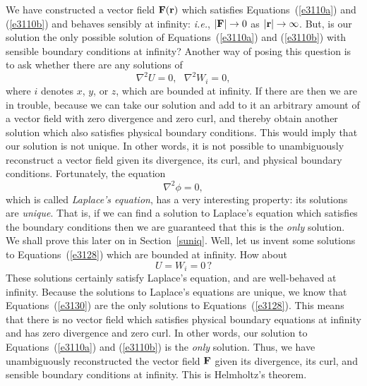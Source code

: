 We have  constructed a vector field ${\bf F}({\bf r})$ which satisfies Equations~(\ref{e3110a}) and (\ref{e3110b})
and  behaves sensibly at infinity: {\em i.e.}, $|{\bf F}|\rightarrow 0$ as
$|{\bf r}|\rightarrow \infty$. But, is our solution the only possible solution
of Equations~(\ref{e3110a}) and (\ref{e3110b}) with sensible boundary conditions at infinity? Another way of posing
this question is to ask whether there are any solutions of
\begin{equation}
\nabla^2 U = 0,~~~\nabla^2 W_i =0,\label{e3128}
\end{equation}
where $i$ denotes $x$, $y$, or $z$, which are bounded at infinity. If there are
then we are in trouble, because we can take our solution and add to it an
arbitrary amount of a vector field with zero divergence and zero curl, and thereby
obtain another solution which also satisfies physical boundary conditions. 
This would imply that our solution is not unique. In other words, it is not
possible to unambiguously reconstruct a vector field given its divergence,
its curl, and physical boundary conditions. Fortunately, the equation
\begin{equation}
\nabla^2 \phi = 0,
\end{equation}
which is called {\em Laplace's equation}, has a very interesting property: its solutions are
{\em unique}. That is, if we can find a solution to Laplace's equation
which satisfies the boundary conditions then we are guaranteed that this is
the {\em only}\/ solution. We shall prove this later on in Section~\ref{suniq}. 
Well, let us invent some solutions to Equations~(\ref{e3128}) which are bounded at infinity.
How about
\begin{equation}
U=W_i =0 \,?\label{e3130}
\end{equation}
These solutions certainly satisfy Laplace's equation, and are well-behaved
at infinity. Because the solutions to Laplace's equations are unique, we know
that Equations~(\ref{e3130}) are the only solutions to Equations~(\ref{e3128}). 
This means that there is no vector field which satisfies physical boundary
equations at infinity and has zero divergence and zero curl. In other words, our
solution to Equations~(\ref{e3110a}) and (\ref{e3110b}) is the {\em only} solution. Thus, we have
unambiguously reconstructed the vector field ${\bf F}$ given its divergence, its
curl, and sensible boundary conditions at infinity. This is Helmholtz's theorem.

